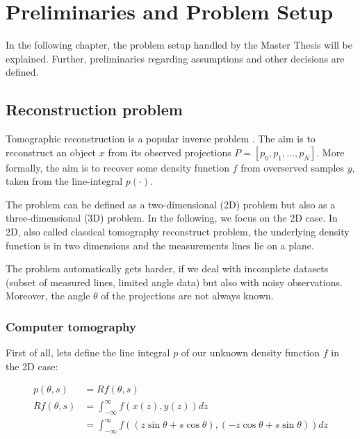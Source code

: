\chapter{Preliminaries and Problem Setup}
\label{sec:preliminariesProblem}


In the following chapter, the problem setup handled by the Master Thesis will be explained.
Further, preliminaries regarding assumptions and other decisions are defined.

\section{Reconstruction problem}
\label{sec:reconstructionProblemCT}
Tomographic reconstruction is a popular inverse problem \cite{tomographicReconstruction}. 
The aim is to reconstruct an object $x$ from its observed projections $P=[p_0, p_1, \dots, p_N]$.
More formally, the aim is to recover some density function $f$ from overserved samples $y$, taken from the line-integral $p(\cdot)$.

The problem can be defined as a two-dimensional (2D) problem but also as a three-dimensional (3D) problem. In the following, we focus on the 2D case.
In 2D, also called classical tomography reconstruct problem, the underlying density function is in two dimensions and the measurements lines lie on a plane.

The problem automatically gets harder, if we deal with incomplete datasets (subset of measured lines, limited angle data) but also with noisy observations.
Moreover, the angle $\theta$ of the projections are not always known.

\subsection{Computer tomography}

First of all, lets define the line integral $p$ of our unknown density function $f$ in the 2D case:

\begin{equation}
    \begin{aligned}
        p(\theta, s)   &=  R f(\theta, s) \\
        R f(\theta, s) &=  \int_{-\infty}^{\infty} f(x(z), y(z)) dz \\
                       &= \int_{-\infty}^{\infty} f((z \sin \theta + s \cos \theta), (-z \cos \theta + s \sin \theta)) dz \\
    \end{aligned}
\end{equation}

